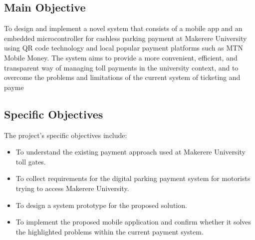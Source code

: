 \subsection{Main Objective}
To design and implement a novel system that consists of a mobile app and an embedded microcontroller for cashless parking payment at Makerere University using QR code technology and local popular payment platforms such as MTN Mobile Money. The system aims to provide a more convenient, efficient, and transparent way of managing toll payments in the university context, and to overcome the problems and limitations of the current system of ticketing and payme

\subsection{Specific Objectives}
The project's specific objectives include:
\begin{itemize}
    \item To understand the existing payment approach used at Makerere University toll gates.
    \item To collect requirements for the digital parking payment system for motorists trying to access Makerere University.
    \item To design a system prototype for the proposed solution.
    \item To implement the proposed mobile application and confirm whether it solves the highlighted problems within the current payment system.
\end{itemize}